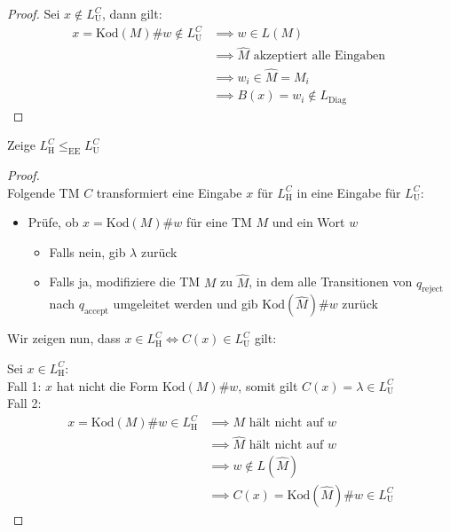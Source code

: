 \documentclass[a4paper,ngerman,12pt]{exam}
\newcommand\kod{\text{Kod}}
\newcommand\Lu{L_{\mathrm{U}}}
\newcommand\Lh{L_{\mathrm{H}}}
\newcommand\LDiag{L_{\mathrm{Diag}}}
\begin{document}
\begin{questions}
\begin{solutionorbox}[18em]
\begin{proof}
        Sei $x \not\in \Lu^C$, dann gilt:
        \begin{align*}
          x = \kod(M)\#w \not\in \Lu^C &\implies w\in L(M) \\
          &\implies \widehat{M} \text{ akzeptiert alle Eingaben } \\
          &\implies w_i \in \widehat{M} = M_i \\
          &\implies B(x) = w_i \not\in \LDiag
        \end{align*}
      \end{proof}
    \end{solutionorbox}

\ifprintanswers
\newpage
\fi

  \question
   Zeige $\Lh^C \leq_{\mathrm{EE}} \Lu^C$
    \begin{solutionorbox}[22em]
      \begin{proof} $ $ \\
      Folgende TM $C$ transformiert eine Eingabe $x$ für $\Lh^C$ in eine Eingabe für $\Lu^C$:
      \begin{itemize}
        \item Prüfe, ob $x = \kod(M)\#w$ für eine TM $M$ und ein Wort $w$
      \begin{itemize}
        \item Falls nein, gib $\lambda$ zurück
        \item Falls ja, modifiziere die TM $M$ zu $\widehat{M}$, in dem
          alle Transitionen von $q_{\mathrm{reject}}$ nach $q_{\mathrm{accept}}$
          umgeleitet werden und gib $\kod(\widehat{M})\#w$ zurück
      \end{itemize}
      \end{itemize}
      Wir zeigen nun, dass $x \in \Lh^C \iff C(x) \in \Lu^C$ gilt:

        Sei $x \in \Lh^C$: \\
        Fall 1: $x$ hat nicht die Form $\kod(M)\#w$, somit gilt $C(x)=\lambda \in \Lu^C$ \\
        Fall 2:
        \begin{align*}
          x = \kod(M)\#w \in \Lh^C &\implies M \text{ hält nicht auf }w \\
          &\implies \widehat{M} \text{ hält nicht auf } w \\
          &\implies w \not\in L(\widehat{M}) \\
          &\implies C(x) = \kod(\widehat{M})\#w \in \Lu^C
        \end{align*}


\end{proof}
\end{solutionorbox}
\end{questions}
\end{document}
